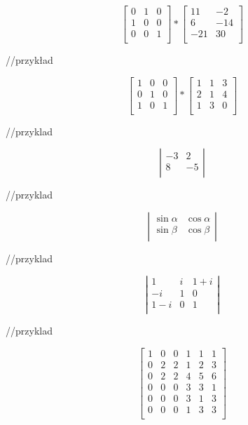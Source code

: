\documentclass[a4paper]{article}
\begin{document}

$$\left[ \begin{array}{ccc}
0 & 1 & 0  \\
1 & 0 & 0  \\
0 & 0 & 1 \\
\end{array} \right]
*
\left[ \begin{array}{cc}
11 & -2  \\
6 & -14  \\
-21 & 30 \\
\end{array} \right]$$

//przykład

$$\left[ \begin{array}{ccc}
1 & 0 & 0  \\
0 & 1 & 0  \\
1 & 0 & 1 \\
\end{array} \right]
*
\left[ \begin{array}{ccc}
1 & 1 & 3  \\
2 & 1 & 4  \\
1 & 3 & 0 \\
\end{array} \right]$$

//przyklad

$$ \left| \begin{array}{cc}
-3 & 2  \\
8 & -5  \\
\end{array} \right|$$

//przyklad 

$$ \left| \begin{array}{cc}
\sin\alpha & \cos\alpha  \\
\sin\beta & \cos\beta  \\
\end{array} \right|$$

//przyklad 

$$\left| \begin{array}{ccc}
1 & i & 1+i \\
-i & 1 & 0 \\
1-i & 0 & 1 \\
\end{array} \right|$$

//przyklad 

$$\left[ \begin{array}{c|cc|ccc}
1 & 0 & 0 & 1 & 1 & 1 \\
\hline
0 & 2 & 2 & 1 & 2 & 3 \\
0 & 2 & 2 & 4 & 5 & 6 \\
\hline
0 & 0 & 0 & 3 & 3 & 1 \\
0 & 0 & 0 & 3 & 1 & 3 \\
0 & 0 & 0 & 1 & 3 & 3 \\
\end{array} \right]$$
\end{document}
